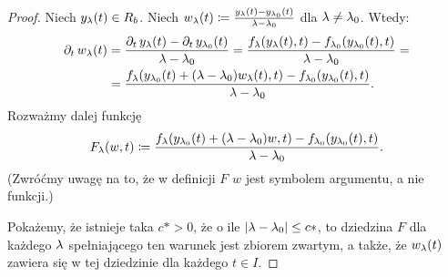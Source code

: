 	\begin{proof}
		Niech $y_\l(t) \in R_b$. Niech $w_\l(t) \coloneqq \frac{ y_\l(t) - y_{\l_0}(t) }{ \l - \l_0 }$ dla $\l \ne \l_0$.
		Wtedy:
		\begin{align*}
		\pd{t} w_\l(t) &= \frac{ \pd{t} y_\l(t) - \pd{t} y_{\l_0}(t) }{ \l - \l_0 } = \frac{ f_\l(y_\l(t), t) - 
			f_{\l_0}(y_{\l_0}(t), t) }{ \l - \l_0 } = \\
		&=  \frac{ f_\l(y_{\l_0}(t) + (\l - \l_0)w_\l(t), t) - 
			f_{\l_0}(y_{\l_0}(t), t) }{ \l - \l_0 } \text{.}
		\end{align*}
		Rozważmy dalej funkcję 
		\begin{equation*}
		F_\l(w, t) \coloneqq \frac{ f_\l(y_{\l_0}(t) + (\l - \l_0)w, t) -  f_{\l_0}(y_{\l_0}(t), t) }{ \l - \l_0 } \text{.}
		\end{equation*}
		(Zwróćmy uwagę na to, że w definicji $F$ $w$ jest symbolem argumentu, a nie funkcji.) 
		
		Pokażemy, że istnieje taka $c* > 0$, że o ile $ \abs{ \l - \l_0} \le c*$, to dziedzina $F$ dla każdego $\l$ spełniającego ten warunek jest zbiorem zwartym, a także, że $w_\l(t)$ zawiera się w tej dziedzinie dla każdego $t \in I$. 
		

\end{proof}

